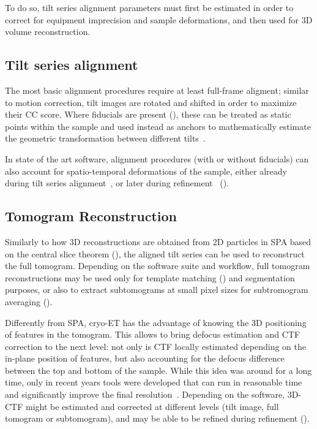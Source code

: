 To do so, tilt series alignment parameters must first be estimated in order to correct for equipment imprecision and sample deformations, and then used for 3D volume reconstruction.

\subsection{Tilt series alignment}\label{et_tilt_series_alignment}
The most basic alignment procedures require at least full-frame aligment; similar to motion correction, tilt images are rotated and shifted in order to maximize their CC score.
Where fiducials are present (), these can be treated as static points within the sample and used instead as anchors to mathematically estimate the geometric transformation between different tilts~\cite{nicastroMolecularArchitectureAxonemes2006,heumannClusteringVarianceMaps2011,castano-diezDynamoCatalogueGeometrical2017}.

In state of the art software, alignment procedures (with or without fiducials) can also account for spatio-temporal deformations of the sample, either already during tilt series alignment~\cite{zhengAreTomoIntegratedSoftware2022}, or later during refinement~\cite{tegunovMultiparticleCryoEMRefinement2021,burtImageProcessingPipeline2024,galaz-montoyaSingleParticleTomography2015,chenCompleteDataProcessing2019} ().

\subsection{Tomogram Reconstruction}\label{et_tomo_reconstruction}
Similarly to how 3D reconstructions are obtained from 2D particles in SPA based on the central slice theorem (), the aligned tilt series can be used to reconstruct the full tomogram.
Depending on the software suite and workflow, full tomogram reconstructions may be used only for template matching () and segmentation purposes, or also to extract subtomograms at small pixel sizes for subtromogram averaging ().

Differently from SPA, cryo-ET has the advantage of knowing the 3D positioning of features in the tomogram.
This allows to bring defocus estimation and CTF correction to the next level: not only is CTF locally estimated depending on the in-plane position of features, but also accounting for the defocus difference between the top and bottom of the sample.
While this idea was around for a long time, only in recent years tools were developed that can run in reasonable time and significantly improve the final resolution~\cite{turonovaEfficient3DCTFCorrection2017,tegunovRealtimeCryoelectronMicroscopy2019}. 
Depending on the software, 3D-CTF might be estimated and corrected at different levels (tilt image, full tomogram or subtomogram), and may be able to be refined during refinement ().

